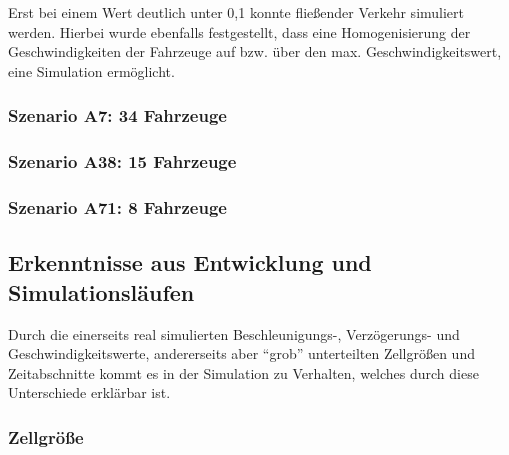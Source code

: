 Erst bei einem Wert deutlich unter 0,1 konnte fließender Verkehr simuliert werden.
Hierbei wurde ebenfalls festgestellt, dass eine Homogenisierung der Geschwindigkeiten der Fahrzeuge auf bzw. über den max. Geschwindigkeitswert, eine Simulation ermöglicht.



\subsubsection{Szenario A7: 34 Fahrzeuge}
\label{sec:szenario-a7}

\subsubsection{Szenario A38: 15 Fahrzeuge}
\label{sec:szenario-a38}

\subsubsection{Szenario A71: 8 Fahrzeuge}
\label{sec:szenario-a71}
















\subsection{Erkenntnisse aus Entwicklung und Simulationsläufen}

Durch die einerseits real simulierten Beschleunigungs-, Verzögerungs- und Geschwindigkeitswerte, andererseits aber \enquote{grob} unterteilten Zellgrößen und Zeitabschnitte kommt es in der Simulation zu Verhalten, welches durch diese Unterschiede erklärbar ist.


\subsubsection{Zellgröße}

